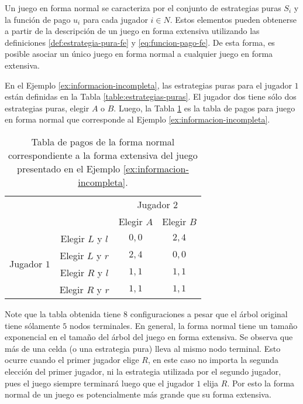 Un juego en forma normal se caracteriza por el conjunto de estrategias puras $S_i$ y la función de pago $u_i$ para cada jugador $i\in N$. Estos elementos pueden obtenerse a partir de la descripción de un juego en forma extensiva utilizando las definiciones \ref{def:estrategia-pura-fe} y \ref{eq:funcion-pago-fe}. De esta forma, es posible asociar un único juego en forma normal a cualquier juego en forma extensiva.

En el Ejemplo \ref{ex:informacion-incompleta}, las estrategias puras para el jugador $1$ están definidas en la Tabla \ref{table:estrategias-puras}. El jugador dos tiene sólo dos estrategias puras, elegir $A$ o $B$. Luego, la Tabla \ref{table:fextensiva-a-fnormal} es la tabla de pagos para juego en forma normal que corresponde al Ejemplo \ref{ex:informacion-incompleta}.

\begin{table}[h]
\begin{center}
\caption[Forma normal de un juego en forma extensiva]{Tabla de pagos de la forma normal correspondiente a la forma extensiva del juego presentado en el Ejemplo \ref{ex:informacion-incompleta}.}
\label{table:fextensiva-a-fnormal}
\begin{tabular}{c c|c|c|}
\multicolumn{2}{c}{} & \multicolumn{2}{c}{Jugador $2$} \\ 
\multicolumn{2}{c}{} & \multicolumn{1}{c}{Elegir $A$} & \multicolumn{1}{c}{Elegir $B$} \\ \cline{3-4}
\multirow{4}{*}{Jugador $1$} & Elegir $L$ y $l$ & $0,0$ & $2,4$ \\ \cline{3-4}
& Elegir $L$ y $r$ & $2,4$ & $0,0$ \\ \cline{3-4}
& Elegir $R$ y $l$ & $1,1$ & $1,1$ \\ \cline{3-4}
& Elegir $R$ y $r$ & $1,1$ & $1,1$ \\ \cline{3-4}
\end{tabular}
\end{center}
\end{table}

Note que la tabla obtenida tiene $8$ configuraciones a pesar que el árbol original tiene sólamente $5$ nodos terminales. En general, la forma normal tiene un tamaño exponencial en el tamaño del árbol del juego en forma extensiva. Se observa que más de una celda (o una estrategia pura) lleva al mismo nodo terminal. Esto ocurre cuando el primer jugador elige $R$, en este caso no importa la segunda elección del primer jugador, ni la estrategia utilizada por el segundo jugador, pues el juego siempre terminará luego que el jugador $1$ elija $R$. Por esto la forma normal de un juego es potencialmente más grande que su forma extensiva.

